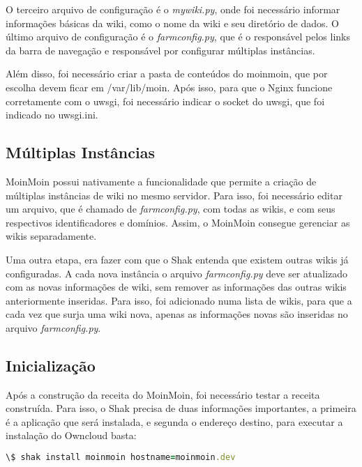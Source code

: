 O terceiro arquivo de configuração é o \textit{mywiki.py}, onde foi necessário
informar informações básicas da wiki, como o nome da wiki e seu diretório de dados. 
O último arquivo de configuração é o \textit{farmconfig.py}, que é o responsável pelos 
links da barra de navegação e responsável por configurar múltiplas instâncias.

Além disso, foi necessário criar a pasta de conteúdos do moinmoin, que por
escolha devem ficar em /var/lib/moin. Após isso, para que o Nginx funcione corretamente
com o uwsgi, foi necessário indicar o socket do uwsgi, que foi indicado no uwsgi.ini.

\subsection{Múltiplas Instâncias}

MoinMoin possui nativamente a funcionalidade que permite a criação de múltiplas 
instâncias de wiki no mesmo servidor. Para isso, foi necessário editar um arquivo,
que é chamado de \textit{farmconfig.py}, com todas as wikis, e com seus 
respectivos identificadores e domínios. Assim, o MoinMoin consegue gerenciar as 
wikis separadamente. 

Uma outra etapa, era fazer com que o Shak entenda que existem outras wikis já 
configuradas. A cada nova instância
o arquivo \textit{farmconfig.py} deve ser atualizado com as novas 
informações de wiki, sem remover as
informações das outras wikis anteriormente inseridas. Para isso, foi adicionado
numa lista de wikis, para que a cada vez que surja uma wiki nova, apenas as
informações novas são inseridas no arquivo \textit{farmconfig.py}.

\subsection{Inicialização}

Após a construção da receita do MoinMoin, foi necessário testar a receita construída. Para 
isso, o Shak precisa de duas informações importantes, a primeira é a aplicação
que será instalada, e segunda o endereço destino, para executar a instalação
do Owncloud basta:

\begin{lstlisting}[language=Ruby,label=dice_index,caption={Exemplo de execução de instalação do owncloud com shak}]
\$ shak install moinmoin hostname=moinmoin.dev
\end{lstlisting}

